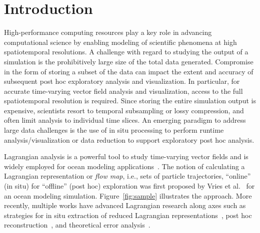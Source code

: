 \documentclass[runningheads]{llncs}
\begin{document}
\section{Introduction}
\label{sec:introduction}
High-performance computing resources play a key role in advancing computational science by enabling modeling of scientific phenomena at high spatiotemporal resolutions.
%
%
A challenge with regard to studying the output of a simulation is the prohibitively large size of the total data generated.
%
Compromise in the form of storing a subset of the data can impact the extent and accuracy of subsequent post hoc exploratory analysis and visualization.
%
In particular, for accurate time-varying vector field analysis and visualization, access to the full spatiotemporal resolution is required.
%
Since storing the entire simulation output is expensive, scientists resort to temporal subsampling or lossy compression, and often limit analysis to individual time slices.
%
An emerging paradigm to address large data challenges is the use of in situ processing to perform runtime analysis/visualization or data reduction to support exploratory post hoc analysis.
%
%

%
Lagrangian analysis is a powerful tool to study time-varying vector fields and is widely employed for ocean modeling applications~\cite{VANSEBILLE201849}.
%
The notion of calculating a Lagrangian representation or \textit{flow map}, i.e., sets of particle trajectories, ``online'' (in situ) for ``offline'' (post hoc) exploration was first proposed by Vries et al.~\cite{vries2001calculating} for an ocean modeling simulation.
%
Figure~\ref{fig:sample} illustrates the approach.
%
More recently, multiple works have advanced Lagrangian research along axes such as strategies for in situ extraction of reduced Lagrangian representations~\cite{agranovsky2014improved}\cite{rapp2019void}\cite{sane2020scalable}, post hoc reconstruction~\cite{chandler2015interpolation}\cite{sane2019interpolation}\cite{Jakob20}, and theoretical error analysis~\cite{bujack2015lagrangian}\cite{chandler2016analysis}\cite{hummel2016error}.
%
\end{document}

